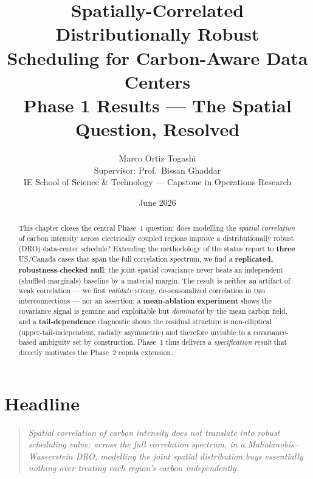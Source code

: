 \documentclass[11pt]{article}
\title{\vspace{-2.2em}\textbf{\color{navy} Spatially-Correlated Distributionally Robust\\[2pt]
Scheduling for Carbon-Aware Data Centers}\\[6pt]
\large\color{gold} Phase 1 Results --- The Spatial Question, Resolved}
\author{Marco Ortiz Togashi \\ \small Supervisor: Prof.\ Bissan Ghaddar \\
\small IE School of Science \& Technology --- Capstone in Operations Research}
\date{June 2026}
\begin{document}
\maketitle
\thispagestyle{empty}

\begin{abstract}
\noindent This chapter closes the central Phase~1 question: does modelling the
\emph{spatial correlation} of carbon intensity across electrically coupled regions
improve a distributionally robust (DRO) data-center schedule? Extending the
methodology of the status report to \textbf{three} US/Canada cases that span the full
correlation spectrum, we find a \textbf{replicated, robustness-checked null}: the
joint spatial covariance never beats an independent (shuffled-marginals) baseline by
a material margin. The result is neither an artifact of weak correlation --- we first
\emph{validate} strong, de-seasonalized correlation in two interconnections --- nor an
assertion: a \textbf{mean-ablation experiment} shows the covariance signal is genuine
and exploitable but \emph{dominated} by the mean carbon field, and a
\textbf{tail-dependence} diagnostic shows the residual structure is non-elliptical
(upper-tail-independent, radially asymmetric) and therefore invisible to a
covariance-based ambiguity set by construction. Phase~1 thus delivers a
\emph{specification result} that directly motivates the Phase~2 copula extension.
\end{abstract}

\vspace{-0.5em}
\section{Headline}\label{sec:headline}

\begin{quote}\itshape\color{navy}
Spatial correlation of carbon intensity does not translate into robust scheduling
value: across the full correlation spectrum, in a Mahalanobis--Wasserstein DRO,
modelling the joint spatial distribution buys essentially nothing over treating each
region's carbon independently.
\end{quote}
\end{document}
